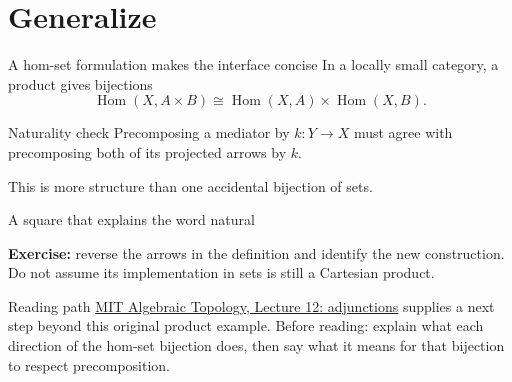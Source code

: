 \documentclass[10pt,aspectratio=43]{beamer}
\DeclareMathOperator{\Hom}{Hom}
\begin{document}
\section{Generalize}
\begin{frame}{A hom-set formulation makes the interface concise}
In a locally small category, a product gives bijections
\[
 \Hom(X,A\times B)\cong\Hom(X,A)\times\Hom(X,B).
\]
\begin{block}{Naturality check}
Precomposing a mediator by $k:Y\to X$ must agree with precomposing both of its projected arrows by $k$.
\end{block}
This is more structure than one accidental bijection of sets.
\end{frame}
\begin{frame}[fragile]{A square that explains the word natural}
\begin{center}
\end{center}
\medskip
\textbf{Exercise:} reverse the arrows in the definition and identify the new construction. Do not assume its implementation in sets is still a Cartesian product.
\end{frame}
\begin{frame}{Reading path}
\small
\href{https://math.mit.edu/~larsh/teaching/S2005/l12/}{MIT Algebraic Topology, Lecture 12: adjunctions} supplies a next step beyond this original product example.
\medskip
Before reading: explain what each direction of the hom-set bijection does, then say what it means for that bijection to respect precomposition.
\end{frame}
\end{document}
